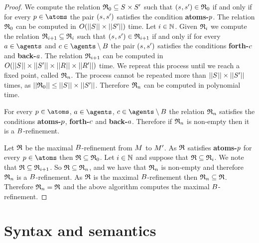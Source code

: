 \begin{proof}
We compute the relation $\refinement_0 \subseteq \kStates \times \kStatesP$ such that $(\kStateS, \kStateSP) \in \refinement_0$ if and only if for every $\atomP \in \atoms$ the pair $(\kStateS, \kStateSP)$ satisfies the condition {\bf atoms-$p$}.
The relation $\mathfrak{R}_0$ can be computed in $O(||\kStates|| \times ||\kStatesP||)$ time.
Let $i \in \mathbb{N}$.
Given $\mathfrak{R}_i$ we compute the relation $\mathfrak{R}_{i+1} \subseteq \mathfrak{R}_i$ such that $(\kStateS, \kStateSP) \in \refinement_{i+1}$ if and only if for every $\agentA \in \agents$ and $\agentC \in \agents \setminus \agentsB$ the pair $(\kStateS, \kStateSP)$ satisfies the conditions {\bf forth-$c$} and {\bf back-$a$}.
The relation $\mathfrak{R}_{i+1}$ can be computed in $O(||\kStates|| \times ||\kStatesP|| \times ||\kAccessibilityRel|| \times ||\kAccessibilityRelP||)$ time.
We repreat this process until we reach a fixed point, called $\mathfrak{R}_n$.
The process cannot be repeated more than $||\kStates|| \times ||\kStatesP||$ times, as $||\refinement_0|| \leq ||\kStates|| \times ||\kStatesP||$.
Therefore $\mathfrak{R}_n$ can be computed in polynomial time.

For every $\atomP \in \atoms$, $\agentA \in \agents$, $\agentC \in \agents \setminus \agentsB$ the relation $\mathfrak{R}_n$ satisfies the conditions {\bf atoms-$p$}, {\bf forth-$c$} and {\bf back-$a$}.
Therefore if $\mathfrak{R}_n$ is non-empty then it is a $B$-refinement.

Let $\mathfrak{R}$ be the maximal $B$-refinement from $\kModel$ to ${M^{\prime}_{}}$.
As $\mathfrak{R}$ satisfies {\bf atoms-$p$} for every $\atomP \in \atoms$ then $\mathfrak{R} \subseteq \mathfrak{R}_0$.
Let $i \in \mathbb{N}$ and suppose that $\mathfrak{R} \subseteq \mathfrak{R}_i$. 
We note that $\mathfrak{R} \subseteq \mathfrak{R}_{i + 1}$.
So $\mathfrak{R} \subseteq \mathfrak{R}_n$, and we have that $\mathfrak{R}_n$ is non-empty and therefore $\mathfrak{R}_n$ is a $B$-refinement.
As $\mathfrak{R}$ is the maximal $B$-refinement then $\mathfrak{R}_n \subseteq \mathfrak{R}$.
Therefore $\mathfrak{R}_n = \mathfrak{R}$ and the above algorithm computes the maximal $B$-refinement.
\end{proof}

\section{Syntax and semantics}

